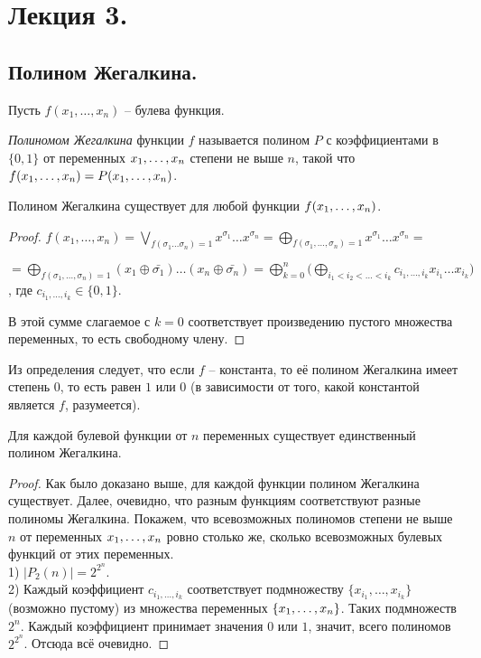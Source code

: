 
\section{Лекция 3.}
\subsection{Полином Жегалкина.} 
Пусть $f(x_1, \ldots, x_n)$ -- булева функция. %
\begin{definition} \textit{Полиномом Жегалкина} функции $f$ называется полином $P$ с коэффициентами в $\{0,1\}$ от переменных $x_1, \ldots, x_n$ степени не выше $n$, такой что $f(x_1, \ldots, x_n) = P(x_1, \ldots, x_n)$. \end{definition}
\begin{statement}
    Полином Жегалкина существует для любой функции $f(x_1, \ldots, x_n)$.
\end{statement}
\begin{proof}
$f(x_1, \ldots, x_n)=\bigvee \limits_{f(\sigma_1 \ldots \sigma_n)=1} x^{\sigma_1} \ldots x^{\sigma_n}=\bigoplus \limits_{f(\sigma_1, \ldots, \sigma_n)=1} x^{\sigma_1} \ldots x^{\sigma_n}=$ 
\begin{flushright}
$
=\bigoplus \limits_{f(\sigma_1, \ldots, \sigma_n)=1} (x_1\oplus \bar{\sigma_1})\ldots(x_n\oplus \bar{\sigma_n})=\bigoplus \limits^n_{k=0} \big( \bigoplus \limits_{i_1<i_2< \ldots<i_k} c_{i_1, \ldots, i_k}x_{i_1} \ldots x_{i_k}\big) $, где  $c_{i_1, \ldots, i_k} \in \{0,1\}$.
\end{flushright} 
В этой сумме слагаемое с $k=0$ соответствует произведению пустого множества переменных, то есть свободному члену.
\end{proof}

Из определения следует, что если $f$ -- константа, то её полином Жегалкина имеет степень $0$, то есть равен $1$ или $0$ (в зависимости от того, какой константой является $f$, разумеется). 
\begin{statement}
	Для каждой булевой функции от $n$ переменных существует единственный полином Жегалкина.
\end{statement}
\begin{proof}
    Как было доказано выше, для каждой функции полином Жегалкина существует. Далее, очевидно, что разным функциям соответствуют разные полиномы Жегалкина. Покажем, что всевозможных полиномов степени не выше $n$ от переменных $x_1, \ldots, x_n$ ровно столько же, сколько всевозможных булевых функций от этих переменных. \\
    1) $|P_2(n)|=2^{2^{n}}$.\\
    2) Каждый коэффициент $c_{i_1, \ldots, i_k}$ соответствует подмножеству $\{x_{i_1}, \ldots, x_{i_k}\}$ (возможно пустому) из множества переменных $\{x_1, \ldots, x_n\}$. Таких подмножеств $2^{n}$. Каждый коэффициент принимает значения $0$ или $1$, значит, всего полиномов $2^{2^n}$. Отсюда всё очевидно.
\end{proof}
